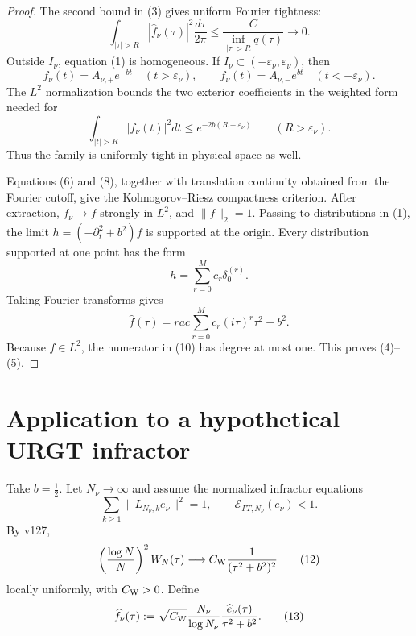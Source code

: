 \documentclass[11pt]{article}
\begin{document}
\begin{proof}
The second bound in (3) gives uniform Fourier tightness:
\begin{equation}
 \int_{|\tau|>R}|\widehat f_\nu(\tau)|^2\frac{d\tau}{2\pi}
 \le\frac{C}{\inf_{|\tau|>R}q(\tau)}\longrightarrow0.      \tag{6}
\end{equation}
Outside $I_\nu$, equation (1) is homogeneous.  If
$I_\nu\subset(-\varepsilon_\nu,\varepsilon_\nu)$, then
\begin{equation}
 f_\nu(t)=A_{\nu,+}e^{-bt}\quad(t>\varepsilon_\nu),
 \qquad
 f_\nu(t)=A_{\nu,-}e^{bt}\quad(t<-\varepsilon_\nu).       \tag{7}
\end{equation}
The $L^2$ normalization bounds the two exterior coefficients in the
weighted form needed for
\begin{equation}
 \int_{|t|>R}|f_\nu(t)|^2dt\le e^{-2b(R-\varepsilon_\nu)}
 \qquad(R>\varepsilon_\nu).                               \tag{8}
\end{equation}
Thus the family is uniformly tight in physical space as well.

Equations (6) and (8), together with translation continuity obtained from
the Fourier cutoff, give the Kolmogorov--Riesz compactness criterion.
After extraction, $f_\nu\to f$ strongly in $L^2$, and $\|f\|_2=1$.
Passing to distributions in (1), the limit
$h=(-\partial_t^2+b^2)f$ is supported at the origin.  Every distribution
supported at one point has the form
\begin{equation}
                         h=\sum_{r=0}^Mc_r\delta_0^{(r)}.   \tag{9}
\end{equation}
Taking Fourier transforms gives
\begin{equation}
 \widehat f(\tau)=rac{\sum_{r=0}^Mc_r(i\tau)^r}
                        {\tau^2+b^2}.                       \tag{10}
\end{equation}
Because $f\in L^2$, the numerator in (10) has degree at most one.  This
proves (4)--(5).
\end{proof}

\section{Application to a hypothetical URGT infractor}

Take $b=\frac12$.  Let $N_\nu\to\infty$ and assume the normalized
infractor equations
\begin{equation}
 \sum_{k\ge1}\|L_{N_\nu,k}e_\nu\|^2=1,
 \qquad
 \mathcal E_{\Gamma T,N_\nu}(e_\nu)<1.                   \tag{11}
\end{equation}
By v127,
\begin{equation}
 \left(\frac{\log N}{N}\right)^2W_N(\tau)
 \longrightarrow
 C_{\rm W}\frac1{(\tau^2+b^2)^2}                          \tag{12}
\end{equation}
locally uniformly, with $C_{\rm W}>0$.  Define
\begin{equation}
 \widehat f_\nu(\tau)
 :=\sqrt{C_{\rm W}}\frac{N_\nu}{\log N_\nu}
       \frac{\widehat e_\nu(\tau)}{\tau^2+b^2}.           \tag{13}
\end{equation}
\end{document}

